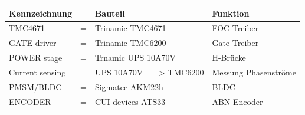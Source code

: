\begin{table}[H]
\center
\begin{tabular}{|lll|l|}
\hline
\textbf{Kennzeichnung} & & \textbf{Bauteil} & \textbf{Funktion} \\
\hline
TMC4671 & = & Trinamic TMC4671 & FOC-Treiber \\
GATE driver & = & Trinamic TMC6200 & Gate-Treiber \\
POWER stage & = & Trnamic UPS 10A70V & H-Brücke \\
Current sensing & = & UPS 10A70V ==> TMC6200 & Messung Phasenströme \\
PMSM/BLDC & = & Sigmatec AKM22h & BLDC \\
ENCODER & = & CUI devices ATS33 & ABN-Encoder \\
\hline
\end{tabular}
\end{table}
